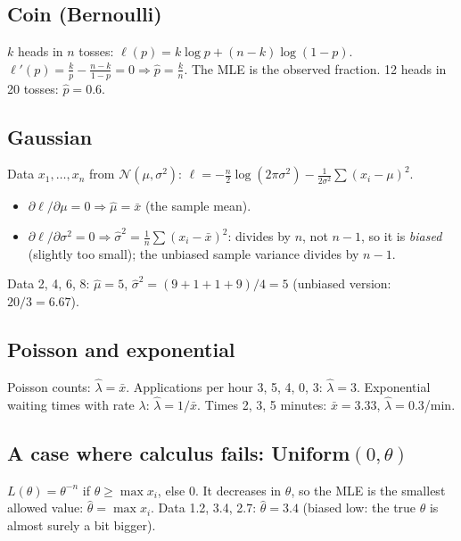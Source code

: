 \subsection{Coin (Bernoulli)}
$k$ heads in $n$ tosses: $\ell(p) = k\log p + (n-k)\log(1-p)$. $\ell'(p) = \frac kp - \frac{n-k}{1-p} = 0 \Rightarrow \hat p = \frac kn$.
The MLE is the observed fraction. 12 heads in 20 tosses: $\hat p = 0.6$.

\subsection{Gaussian}
Data $x_1,\dots,x_n$ from $\mathcal N(\mu,\sigma^2)$:
$\ell = -\frac n2\log(2\pi\sigma^2) - \frac{1}{2\sigma^2}\sum(x_i - \mu)^2$.
\begin{itemize}
\item $\partial\ell/\partial\mu = 0 \Rightarrow \hat\mu = \bar x$ (the sample mean).
\item $\partial\ell/\partial\sigma^2 = 0 \Rightarrow \hat\sigma^2 = \frac1n\sum(x_i - \bar x)^2$: divides by $n$, not $n-1$, so it is
  \emph{biased} (slightly too small); the unbiased sample variance divides by $n-1$.
\end{itemize}
\begin{example}
Data 2, 4, 6, 8: $\hat\mu = 5$, $\hat\sigma^2 = (9 + 1 + 1 + 9)/4 = 5$ (unbiased version: $20/3 = 6.67$).
\end{example}

\subsection{Poisson and exponential}
Poisson counts: $\hat\lambda = \bar x$. Applications per hour 3, 5, 4, 0, 3: $\hat\lambda = 3$.
Exponential waiting times with rate $\lambda$: $\hat\lambda = 1/\bar x$. Times 2, 3, 5 minutes: $\bar x = 3.33$, $\hat\lambda = 0.3$/min.

\subsection{A case where calculus fails: Uniform$(0,\theta)$}
$L(\theta) = \theta^{-n}$ if $\theta\ge\max x_i$, else 0. It decreases in $\theta$, so the MLE is the smallest allowed value:
$\hat\theta = \max x_i$. Data 1.2, 3.4, 2.7: $\hat\theta = 3.4$ (biased low: the true $\theta$ is almost surely a bit bigger).

